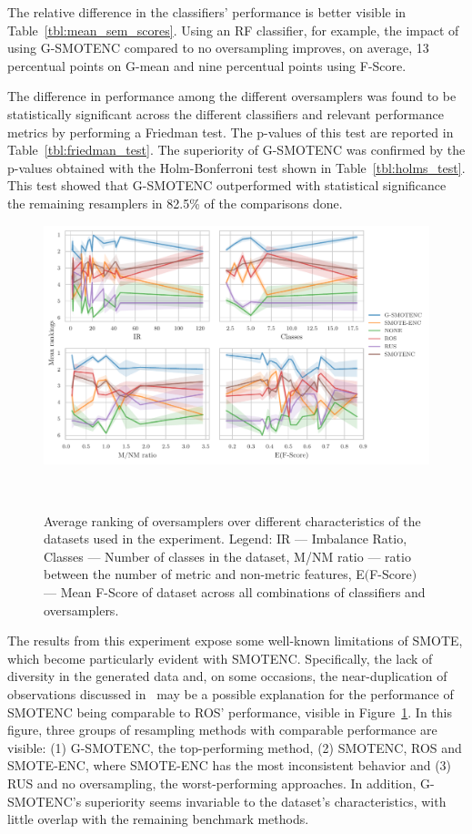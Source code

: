 \documentclass[preprint,12pt]{elsarticle}
\begin{document}
{The relative difference in the classifiers' performance is better visible in
Table~\ref{tbl:mean_sem_scores}. Using an RF classifier, for example, the
impact of using G-SMOTENC compared to no oversampling improves, on average, 13
percentual points on G-mean and nine percentual points using F-Score. 

The difference in performance among the different oversamplers was found to be
statistically significant across the different classifiers and relevant
performance metrics by performing a Friedman test. The p-values of this test
are reported in Table~\ref{tbl:friedman_test}. The superiority of G-SMOTENC
was confirmed by the p-values obtained with the Holm-Bonferroni test shown in
Table~\ref{tbl:holms_test}. This test showed that G-SMOTENC outperformed with
statistical significance the remaining resamplers in 82.5\% of the comparisons
done.

\begin{figure}[ht]
	\centering
	\includegraphics[width=\linewidth]{../analysis/consistency_analysis_plot}
    \caption{Average ranking of oversamplers over different characteristics of
        the datasets used in the experiment. Legend: IR --- Imbalance Ratio,
        Classes --- Number of classes in the dataset, M/NM ratio --- ratio
        between the number of metric and non-metric features, E$($F-Score$)$
        --- Mean F-Score of dataset across all combinations of classifiers and
        oversamplers.
    }~\label{fig:consistency_analysis}
\end{figure}


The results from this experiment expose some well-known limitations of SMOTE,
which become particularly evident with SMOTENC. Specifically, the lack of
diversity in the generated data and, on some occasions, the near-duplication
of observations discussed in~\cite{douzas2019geometric} may be a possible
explanation for the performance of SMOTENC being comparable to ROS'
performance, visible in Figure~\ref{fig:consistency_analysis}. In this
figure, three groups of resampling methods with comparable performance are
visible: (1) G-SMOTENC, the top-performing method, (2) SMOTENC, ROS and
SMOTE-ENC, where SMOTE-ENC has the most inconsistent behavior and (3) RUS and
no oversampling, the worst-performing approaches. In addition, G-SMOTENC's
superiority seems invariable to the dataset's characteristics, with little
overlap with the remaining benchmark methods.

}
\end{document}
